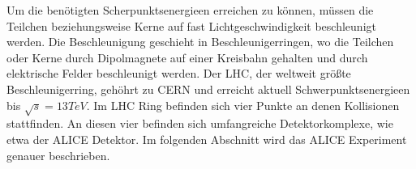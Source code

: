 Um die ben\"otigten Scherpunktsenergieen erreichen zu k\"onnen, m\"ussen die Teilchen beziehungsweise Kerne auf fast Lichtgeschwindigkeit beschleunigt werden.
Die Beschleunigung geschieht in Beschleunigerringen, wo die Teilchen oder Kerne durch Dipolmagnete auf einer Kreisbahn gehalten und durch elektrische Felder beschleunigt werden.
Der LHC, der weltweit gr\"o{\ss}te Beschleunigerring, geh\"ohrt zu CERN und erreicht aktuell Schwerpunktsenergieen bis $\sqrt{s} = 13 TeV$.
Im LHC Ring befinden sich vier Punkte an denen Kollisionen stattfinden.
An diesen vier befinden sich umfangreiche Detektorkomplexe, wie etwa der ALICE Detektor.
Im folgenden Abschnitt wird das ALICE Experiment genauer beschrieben.